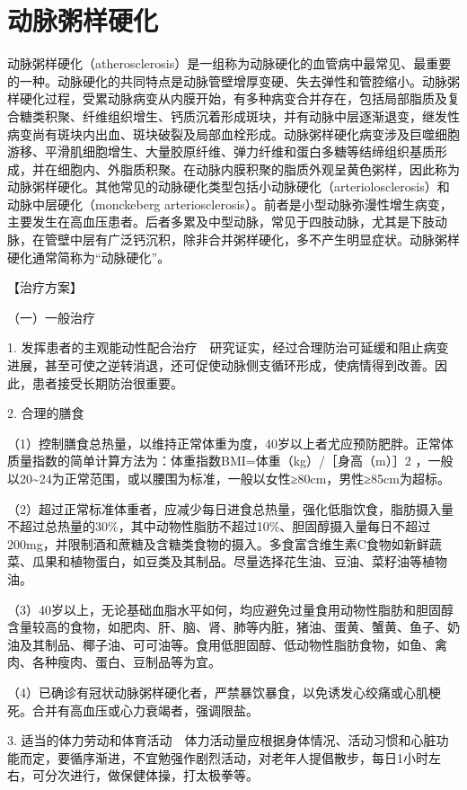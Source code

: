 \section{动脉粥样硬化}

动脉粥样硬化（atherosclerosis）是一组称为动脉硬化的血管病中最常见、最重要的一种。动脉硬化的共同特点是动脉管壁增厚变硬、失去弹性和管腔缩小。动脉粥样硬化过程，受累动脉病变从内膜开始，有多种病变合并存在，包括局部脂质及复合糖类积聚、纤维组织增生、钙质沉着形成斑块，并有动脉中层逐渐退变，继发性病变尚有斑块内出血、斑块破裂及局部血栓形成。动脉粥样硬化病变涉及巨噬细胞游移、平滑肌细胞增生、大量胶原纤维、弹力纤维和蛋白多糖等结缔组织基质形成，并在细胞内、外脂质积聚。在动脉内膜积聚的脂质外观呈黄色粥样，因此称为动脉粥样硬化。其他常见的动脉硬化类型包括小动脉硬化（arteriolosclerosis）和动脉中层硬化（monckeberg
arteriosclerosis）。前者是小型动脉弥漫性增生病变，主要发生在高血压患者。后者多累及中型动脉，常见于四肢动脉，尤其是下肢动脉，在管壁中层有广泛钙沉积，除非合并粥样硬化，多不产生明显症状。动脉粥样硬化通常简称为“动脉硬化”。

【治疗方案】

{（一）一般治疗}

1.
发挥患者的主观能动性配合治疗　研究证实，经过合理防治可延缓和阻止病变进展，甚至可使之逆转消退，还可促使动脉侧支循环形成，使病情得到改善。因此，患者接受长期防治很重要。

2. 合理的膳食

（1）控制膳食总热量，以维持正常体重为度，40岁以上者尤应预防肥胖。正常体质量指数的简单计算方法为：体重指数BMI=体重（kg）/［身高（m）］{2}
，一般以20\textasciitilde{}24为正常范围，或以腰围为标准，一般以女性≥80cm，男性≥85cm为超标。

（2）超过正常标准体重者，应减少每日进食总热量，强化低脂饮食，脂肪摄入量不超过总热量的30\%，其中动物性脂肪不超过10\%、胆固醇摄入量每日不超过200mg，并限制酒和蔗糖及含糖类食物的摄入。多食富含维生素C食物如新鲜蔬菜、瓜果和植物蛋白，如豆类及其制品。尽量选择花生油、豆油、菜籽油等植物油。

（3）40岁以上，无论基础血脂水平如何，均应避免过量食用动物性脂肪和胆固醇含量较高的食物，如肥肉、肝、脑、肾、肺等内脏，猪油、蛋黄、蟹黄、鱼子、奶油及其制品、椰子油、可可油等。食用低胆固醇、低动物性脂肪食物，如鱼、禽肉、各种瘦肉、蛋白、豆制品等为宜。

（4）已确诊有冠状动脉粥样硬化者，严禁暴饮暴食，以免诱发心绞痛或心肌梗死。合并有高血压或心力衰竭者，强调限盐。

3.
适当的体力劳动和体育活动　体力活动量应根据身体情况、活动习惯和心脏功能而定，要循序渐进，不宜勉强作剧烈活动，对老年人提倡散步，每日1小时左右，可分次进行，做保健体操，打太极拳等。

